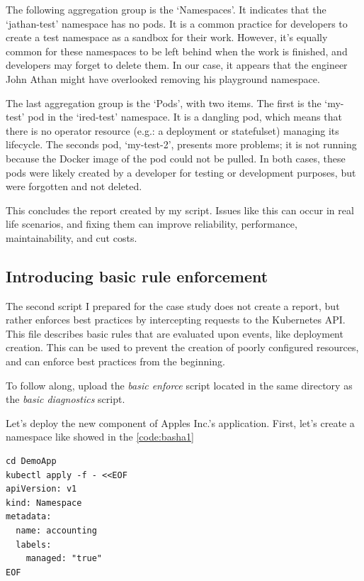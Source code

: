 The following aggregation group is the `Namespaces'. It indicates that the `jathan-test' namespace has no pods. It is a common practice for developers to create a test namespace as a sandbox for their work. However, it's equally common for these namespaces to be left behind when the work is finished, and developers may forget to delete them. In our case, it appears that the engineer John Athan might have overlooked removing his playground namespace.

The last aggregation group is the `Pods', with two items. The first is the `my-test' pod in the `ired-test' namespace. It is a dangling pod, which means that there is no operator resource (e.g.: a deployment or statefulset) managing its lifecycle. The seconds pod, `my-test-2', presents more problems; it is not running because the Docker image of the pod could not be pulled.  In both cases, these pods were likely created by a developer for testing or development purposes, but were forgotten and not deleted.

This concludes the report created by my script. Issues like this can occur in real life scenarios, and fixing them can improve reliability, performance, maintainability, and cut costs.

\subsection{Introducing basic rule enforcement}

The second script I prepared for the case study does not create a report, but rather enforces best practices by intercepting requests to the Kubernetes API.
This file describes basic rules that are evaluated upon events, like deployment creation. This can be used to prevent the creation of poorly configured resources, and can enforce best practices from the beginning.

To follow along, upload the \emph{basic enforce} script located in the same directory as the \emph{basic diagnostics} script.

Let's deploy the new component of Apples Inc.'s application. First, let's create a namespace like showed in the \ref{code:basha1}

\begin{lstlisting}[caption={Create namespace for the Accounting module},language=mybash,label=code:basha1]
cd DemoApp
kubectl apply -f - <<EOF
apiVersion: v1
kind: Namespace
metadata:
  name: accounting
  labels:
    managed: "true"
EOF
\end{lstlisting}

